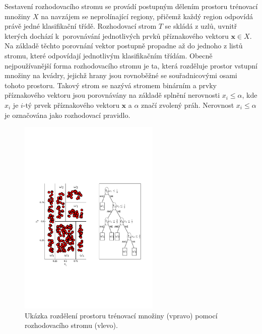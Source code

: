 \par{Sestavení rozhodovacího stromu se provádí postupným dělením prostoru trénovací množiny $X$ na navzájem se neprolínající regiony, přičemž každý region odpovídá právě jedné klasifikační třídě. Rozhodovací strom $T$ se skládá z uzlů, uvnitř kterých dochází k~porovnávání jednotlivých prvků příznakového vektoru $\bm{x}\in X$. Na základě těchto porovnání vektor postupně propadne až do jednoho z listů stromu, které odpovídají jednotlivým klasifikačním třídám. Obecně nejpoužívanější forma rozhodovacího stromu je ta, která rozděluje prostor vstupní množiny na kvádry, jejichž hrany jsou rovnoběžné se souřadnicovými osami tohoto prostoru. Takový strom se nazývá stromem binárním a prvky příznakového vektoru jsou porovnávány na základě splnění nerovnosti $x_i \leq\alpha$, kde $x_i$ je $i$-tý prvek příznakového vektoru $\bm{x}$ a $\alpha$ značí zvolený práh. Nerovnost $x_i \leq\alpha$ je označována jako rozhodovací pravidlo.
\begin{figure}[!ht]
	\centering
	\includegraphics[width = 0.6\textwidth, trim = 3cm 7.5cm 2cm 9cm]{./Img/Prednaska09/decisionTrees/DT01.pdf}
	\caption{Ukázka rozdělení prostoru trénovací množiny (vpravo) pomocí rozhodovacího stromu (vlevo).}
	\label{fig:DT01}
\end{figure}}

